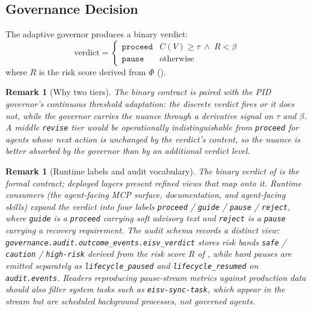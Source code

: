 \documentclass[11pt,twocolumn]{article}
\newtheorem{remark}[theorem]{Remark}
\begin{document}
\subsection{Governance Decision}

The adaptive governor produces a binary verdict:
\begin{equation}
  \text{verdict} = \begin{cases}
    \texttt{proceed} & C(V) \!\geq\! \tau \;\wedge\; R \!<\! \beta \\
    \texttt{pause} & \text{otherwise}
  \end{cases}
  \label{eq:verdict}
\end{equation}
where $R$ is the risk score derived from $\Phi$ ().

\begin{remark}[Why two tiers]
The binary contract is paired with the PID governor's continuous
threshold adaptation: the discrete verdict fires or it does not,
while the governor carries the nuance through a derivative signal
on $\tau$ and $\beta$. A middle \texttt{revise} tier would be
operationally indistinguishable from \texttt{proceed} for agents
whose next action is unchanged by the verdict's content, so the
nuance is better absorbed by the governor than by an additional
verdict level.
\end{remark}

\begin{remark}[Runtime labels and audit vocabulary]
\label{rem:verdict-vocabulary}
The binary verdict of  is the formal contract;
deployed layers present refined views that map onto it. Runtime
consumers (the agent-facing MCP surface, documentation, and
agent-facing skills) expand the verdict into four labels
\texttt{proceed} / \texttt{guide} / \texttt{pause} /
\texttt{reject}, where \texttt{guide} is a \texttt{proceed} carrying
soft advisory text and \texttt{reject} is a \texttt{pause} carrying
a recovery requirement. The audit schema records a distinct view:
\nolinkurl{governance.audit.outcome_events.eisv_verdict} stores risk
bands \texttt{safe} / \texttt{caution} / \texttt{high-risk} derived
from the risk score $R$ of , while hard pauses are
emitted separately as \texttt{lifecycle\_paused} and
\texttt{lifecycle\_resumed} on \texttt{audit.events}. Readers
reproducing pause-stream metrics against production data should
also filter system tasks such as \texttt{eisv-sync-task}, which
appear in the stream but are scheduled background processes, not
governed agents.
\end{remark}
\end{document}

